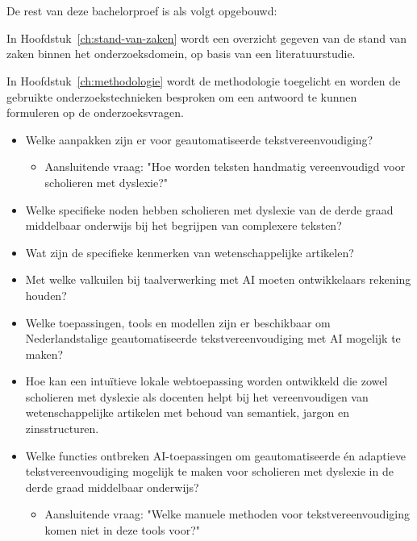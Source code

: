 \section{}%
\label{sec:opzet-bachelorproef}

De rest van deze bachelorproef is als volgt opgebouwd:

In Hoofdstuk~\ref{ch:stand-van-zaken} wordt een overzicht gegeven van de stand van zaken binnen het onderzoeksdomein, op basis van een literatuurstudie.

In Hoofdstuk~\ref{ch:methodologie} wordt de methodologie toegelicht en worden de gebruikte onderzoekstechnieken besproken om een antwoord te kunnen formuleren op de onderzoeksvragen.

\begin{itemize}
	\item Welke aanpakken zijn er voor geautomatiseerde tekstvereenvoudiging?
	\begin{itemize}
		\item Aansluitende vraag: "Hoe worden teksten handmatig vereenvoudigd voor scholieren met dyslexie?"
	\end{itemize}
	\item Welke specifieke noden hebben scholieren met dyslexie van de derde graad middelbaar onderwijs bij het begrijpen van complexere teksten?
	\item Wat zijn de specifieke kenmerken van wetenschappelijke artikelen? 
	\item Met welke valkuilen bij taalverwerking met AI moeten ontwikkelaars rekening houden?
	\item Welke toepassingen, tools en modellen zijn er beschikbaar om Nederlandstalige geautomatiseerde tekstvereenvoudiging met AI mogelijk te maken?
	\item Hoe kan een intuïtieve lokale webtoepassing worden ontwikkeld die zowel scholieren met dyslexie als docenten helpt bij het vereenvoudigen van wetenschappelijke artikelen met behoud van semantiek, jargon en zinsstructuren.
	\item Welke functies ontbreken AI-toepassingen om geautomatiseerde én adaptieve tekstvereenvoudiging mogelijk te maken voor \newline scholieren met dyslexie in de derde graad middelbaar onderwijs? 
	\begin{itemize}
		\item Aansluitende vraag: "Welke manuele methoden voor tekstvereenvoudiging komen niet in deze tools voor?"
	\end{itemize}
\end{itemize}

